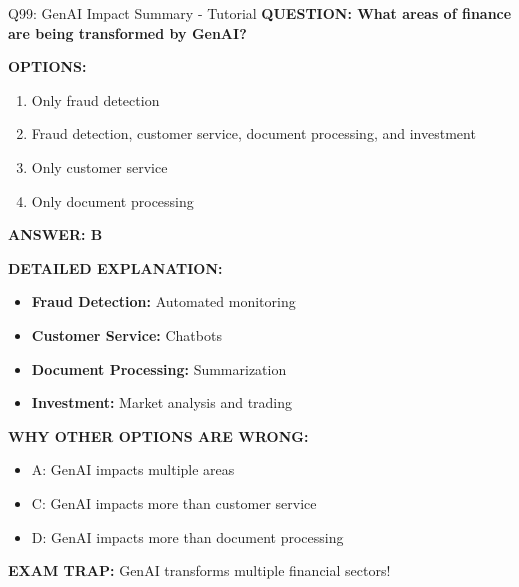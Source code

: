 \documentclass[8pt]{beamer}
\begin{document}
	\begin{frame}{Q99: GenAI Impact Summary - Tutorial}
		\fontsize{6.5}{7.5}\selectfont
		\textbf{QUESTION: What areas of finance are being transformed by GenAI?}
		
		\vspace{0.1cm}
		\textbf{OPTIONS:}
		\begin{enumerate}
			\item Only fraud detection
			\item Fraud detection, customer service, document processing, and investment
			\item Only customer service
			\item Only document processing
		\end{enumerate}
		
		\vspace{0.1cm}
		\textcolor{myblue}{\textbf{ANSWER: B}}
		
		\vspace{0.1cm}
		\textbf{DETAILED EXPLANATION:}
		\begin{itemize}
			\item \textbf{Fraud Detection:} Automated monitoring
			\item \textbf{Customer Service:} Chatbots
			\item \textbf{Document Processing:} Summarization
			\item \textbf{Investment:} Market analysis and trading
		\end{itemize}
		
		\vspace{0.1cm}
		\textcolor{myred}{\textbf{WHY OTHER OPTIONS ARE WRONG:}}
		\begin{itemize}
			\item \textcolor{myred}{A:} GenAI impacts multiple areas
			\item \textcolor{myred}{C:} GenAI impacts more than customer service
			\item \textcolor{myred}{D:} GenAI impacts more than document processing
		\end{itemize}
		
		\textcolor{myred}{\textbf{EXAM TRAP:}} GenAI transforms \textcolor{myblue}{multiple financial sectors}!
	\end{frame}
	
\end{document}
